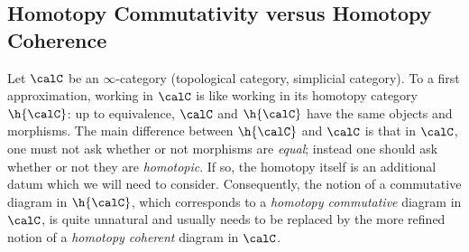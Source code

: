 \subsection{Homotopy Commutativity versus Homotopy Coherence}\label{comcoh}

Let $\calC$ be an $\infty$-category (topological category, simplicial category). 
To a first approximation,
working in $\calC$ is like working in its homotopy category $\h{
\calC}$: up to equivalence, $\calC$ and $\h{\calC}$ have the same
objects and morphisms. The main difference between $\h{\calC}$ and
$\calC$ is that in $\calC$, one must not ask whether or not
morphisms are {\em equal}; instead one should ask whether or not they are {\it homotopic}. If so, the homotopy itself is an additional datum which we will need to consider. Consequently, the notion of a commutative diagram in
$\h{\calC}$, which corresponds to a {\it homotopy commutative}
diagram in $\calC$, is quite unnatural and usually needs to be
replaced by the more refined notion of a {\it homotopy coherent}
diagram in $\calC$.

